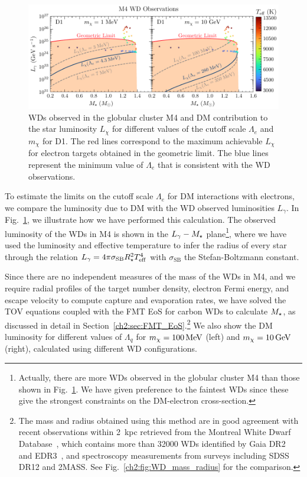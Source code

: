 \begin{figure}[t!bp]
    \centering
    \includegraphics[width=\textwidth]{wd_capture/Lum_WDmass_M4.pdf}
    \caption[WDs observed in the globular cluster M4 and DM contribution to the star luminosity $L_\chi$ for different values of the cutoff scale $\Lambda_e$ and $m_\chi$ for D1.]{WDs observed in the globular cluster M4 and DM contribution to the star luminosity $L_\chi$ for different values of the cutoff scale $\Lambda_e$ and $m_\chi$ for D1. The red lines correspond to the maximum achievable $L_\chi$ for electron targets obtained in the geometric limit. The blue lines represent the minimum value of $\Lambda_e$ that is consistent with the WD observations. }
    \label{ch4:fig:limitset}
\end{figure}


To estimate the limits on the cutoff scale $\Lambda_e$ for DM interactions with electrons, we compare the luminosity due to DM  with the WD observed luminosities $L_\gamma$. In Fig.~\ref{ch4:fig:limitset}, we illustrate how we have performed this calculation.
The observed luminosity of the WDs in M4 is shown in the $L_\gamma-M_\star$ plane\footnote{Actually, there are more WDs observed in the globular cluster M4 than those shown in Fig.~\ref{ch4:fig:limitset}. We have given preference to the faintest WDs since these give the strongest constraints on the DM-electron cross-section.}, where we have used the luminosity and effective temperature to infer the radius of every star through the relation $L_\gamma = 4\pi \sigma_\mathrm{SB} R_\star^2 T_\mathrm{eff}^4$ with $\sigma_\mathrm{SB}$ the Stefan-Boltzmann constant. 

Since there are no independent measures of the mass of the WDs in M4, and we require radial profiles of the target number density, electron Fermi energy, and escape velocity to compute capture and evaporation rates, we have solved the TOV equations coupled with the FMT EoS for carbon WDs to calculate $M_\star$, as discussed in detail in Section~\ref{ch2:sec:FMT_EoS}.\footnote{The mass and radius obtained using this method are in good agreement with recent observations within 2~kpc retrieved from the Montreal White Dwarf Database~\cite{Dufour_mar_Montrealwhitedwarf}, which contains more than 32000 WDs identified by Gaia DR2~\cite{Torres_feb_GaiaDR2halo} and EDR3~\cite{Gaia:2020wqu_may_Gaiaearlydata}, and spectroscopy measurements from surveys including SDSS DR12 and 2MASS. See Fig.~\ref{ch2:fig:WD_mass_radius} for the comparison.}  We also show the DM luminosity for different values of $\Lambda_q$ for $m_\chi=100{\rm \,MeV}$ (left) and $m_\chi=10{\rm \,GeV}$ (right), calculated using different WD configurations. 

